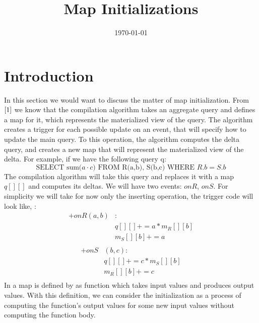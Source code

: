 \documentclass[12pt]{article}
\title{Map Initializations}
\date{\today}
\begin{document}
\maketitle
\section{Introduction}
In this section we would want to discuss the matter of map initialization. From $\cite{1}$ we know that the compilation algorithm takes an aggregate query and defines a map for it, which represents the materialized view of the query. The algorithm creates a trigger for each possible update on an event, that will specify how to update the main query. To this operation, the algorithm computes the delta query, and creates a new map that will represent the materialized view of the delta. For example, if we have the following query q:
\begin{equation}
\mbox{SELECT sum(}a\cdot c\mbox{) FROM R(a,b), S(b,c) WHERE } R.b=S.b
\end{equation}
The compilation algorithm will take this query and replaces it with a map $q[][]$ and computes its deltas. We will have two events: $onR$, $onS$. For simplicity we will take for now only the inserting operation, the trigger code will look like, :
\begin{align*}
+onR(a,b)&:\\
&q[][]+=a*m_R[][b]\\
&m_S[][b]+=a\\
\end{align*}\vspace{-40pt}
\begin{align*}
+onS&(b,c):\\
&q[][]+=c*m_S[][b]\\
&m_R[][b]+=c\\
\end{align*}
In \cite{1} a map is defined by as function which takes input values and produces output values. With this definition, we can consider the initialization as a process of computing the function's output values for some new input values without computing the function body.
\end{document}
